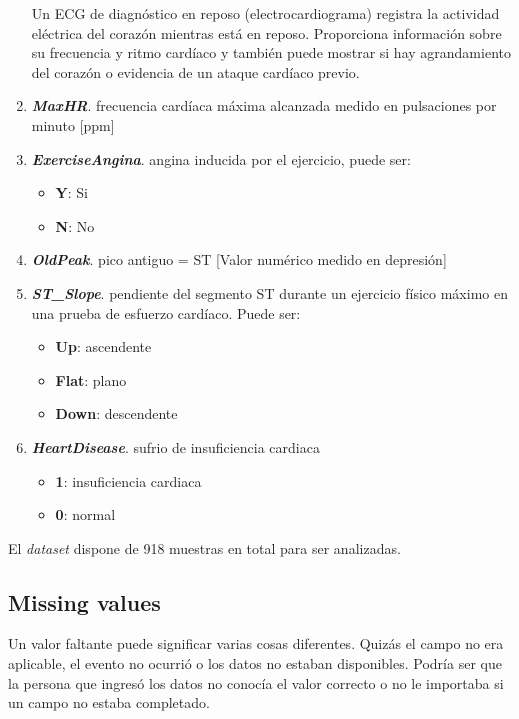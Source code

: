 \documentclass[12pt, letterpaper]{article}
\begin{document}
\begin{enumerate}
{    Un ECG de diagnóstico en reposo (electrocardiograma) registra la actividad eléctrica 
    del corazón mientras está en reposo. Proporciona información sobre su frecuencia y 
    ritmo cardíaco y también puede mostrar si hay agrandamiento del corazón o 
    evidencia de un ataque cardíaco previo. \cite{electrocardiograma}
    } 
    \item{\textbf{\textit{MaxHR}}. frecuencia cardíaca máxima alcanzada
    medido en pulsaciones por minuto [ppm]}
    \item{\textbf{\textit{ExerciseAngina}}. angina inducida por el ejercicio, puede ser:
    \begin{itemize}
        \item{\textbf{Y}}: Si
        \item{\textbf{N}}: No
    \end{itemize}
    }
    \item{\textbf{\textit{OldPeak}}. pico antiguo = ST [Valor numérico medido en depresión]}
    \item{\textbf{\textit{ST\_Slope}}. pendiente del segmento ST 
    durante un ejercicio físico máximo en una prueba de 
    esfuerzo cardíaco. Puede ser:
    \begin{itemize}
        \item{\textbf{Up}}: ascendente
        \item{\textbf{Flat}}: plano
        \item{\textbf{Down}}: descendente
    \end{itemize}
    }
    \item{\textbf{\textit{HeartDisease}}. sufrio de insuficiencia cardiaca
    \begin{itemize}
        \item{\textbf{1}}: insuficiencia cardiaca
        \item{\textbf{0}}: normal
    \end{itemize}
    }
\end{enumerate}
El \textit{dataset} dispone de 918 muestras en total para ser analizadas.

\subsection{Missing values}
Un valor faltante puede significar varias cosas diferentes. 
Quizás el campo no era aplicable, el evento no ocurrió o los datos no estaban disponibles. 
Podría ser que la persona que ingresó los datos no conocía el valor correcto o no le importaba 
si un campo no estaba completado. \cite{missin_values}
\end{document}
